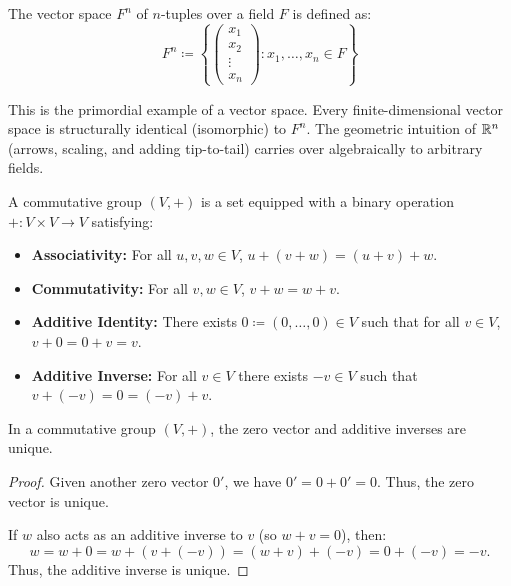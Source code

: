 \documentclass[../linear_algebra_and_groups.tex]{subfiles}
\begin{document}
\begin{definition}
    \begin{shaded*}
        The vector space $F^n$ of $n$-tuples over a field $F$ is defined as:
        $$F^n\coloneqq\left\{\begin{pmatrix}x_1\\x_2\\\vdots\\x_n\end{pmatrix}:x_1,\dots,x_n\in F\right\}$$
    \end{shaded*}
\end{definition}

\begin{remark}
    This is the primordial example of a vector space. Every finite-dimensional vector space is structurally identical (isomorphic) to $F^n$. The geometric intuition of $\mathbb{R}^n$ (arrows, scaling, and adding tip-to-tail) carries over algebraically to arbitrary fields.
\end{remark}

\begin{definition}
    \begin{shaded*}
        A commutative group $(V,+)$ is a set equipped with a binary operation $+:V\times V\to V$ satisfying:
        \begin{itemize}
            \item \textbf{Associativity:} For all $u,v,w\in V$, $u+(v+w)=(u+v)+w$.
            \item \textbf{Commutativity:} For all $v,w\in V$, $v+w=w+v$.
            \item \textbf{Additive Identity:} There exists $0\coloneqq(0,\dots,0)\in V$ such that for all $v\in V$, $v+0=0+v=v$.
            \item \textbf{Additive Inverse:} For all $v\in V$ there exists $-v\in V$ such that $v+(-v)=0=(-v)+v$.
        \end{itemize}
    \end{shaded*}
\end{definition}

\begin{lemma}
    \begin{shaded*}
        In a commutative group $(V,+)$, the zero vector and additive inverses are unique.
    \end{shaded*}
\end{lemma}
\begin{proof}
    Given another zero vector $0'$, we have $0'=0+0'=0$. Thus, the zero vector is unique. 
    
    If $w$ also acts as an additive inverse to $v$ (so $w+v=0$), then:
    $$w=w+0=w+(v+(-v))=(w+v)+(-v)=0+(-v)=-v.$$
    Thus, the additive inverse is unique.
    \qedhere
\end{proof}
\end{document}
